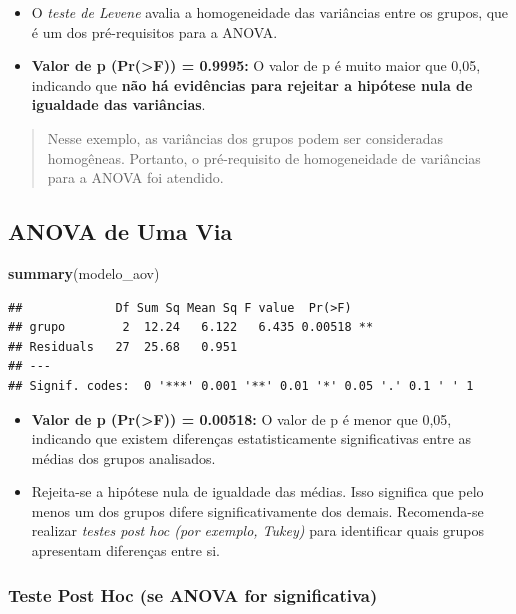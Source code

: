 \documentclass[
]{book}
\newenvironment{Shaded}{\begin{snugshade}}{\end{snugshade}}
\newcommand{\FunctionTok}[1]{\textcolor[rgb]{0.13,0.29,0.53}{\textbf{#1}}}
\newcommand{\NormalTok}[1]{#1}
\begin{document}
\begin{itemize}
\item
  O \emph{teste de Levene} avalia a homogeneidade das variâncias entre os grupos, que é um dos pré-requisitos para a ANOVA.
\item
  \textbf{Valor de p (Pr(\textgreater F)) = 0.9995:} O valor de p é muito maior que 0,05, indicando que \textbf{não há evidências para rejeitar a hipótese nula de igualdade das variâncias}.
\end{itemize}

\begin{quote}
Nesse exemplo, as variâncias dos grupos podem ser consideradas homogêneas. Portanto, o pré-requisito de homogeneidade de variâncias para a ANOVA foi atendido.
\end{quote}

\subsection{ANOVA de Uma Via}\label{anova-de-uma-via}

\begin{Shaded}
\begin{Highlighting}[]
\FunctionTok{summary}\NormalTok{(modelo\_aov)}
\end{Highlighting}
\end{Shaded}

\begin{verbatim}
##             Df Sum Sq Mean Sq F value  Pr(>F)   
## grupo        2  12.24   6.122   6.435 0.00518 **
## Residuals   27  25.68   0.951                   
## ---
## Signif. codes:  0 '***' 0.001 '**' 0.01 '*' 0.05 '.' 0.1 ' ' 1
\end{verbatim}

\begin{itemize}
\item
  \textbf{Valor de p (Pr(\textgreater F)) = 0.00518:} O valor de p é menor que 0,05, indicando que existem diferenças estatisticamente significativas entre as médias dos grupos analisados.
\item
  Rejeita-se a hipótese nula de igualdade das médias. Isso significa que pelo menos um dos grupos difere significativamente dos demais. Recomenda-se realizar \emph{testes post hoc (por exemplo, Tukey)} para identificar quais grupos apresentam diferenças entre si.
\end{itemize}

\subsubsection{Teste Post Hoc (se ANOVA for significativa)}\label{teste-post-hoc-se-anova-for-significativa}
\end{document}
